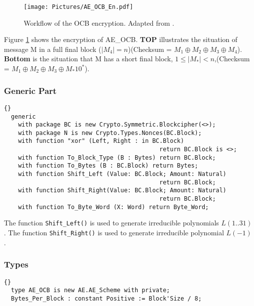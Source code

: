 \begin{figure}[h]
\centering
\texttt{[image: Pictures/AE\_OCB\_En.pdf]} 
\caption{Workflow of the OCB encryption. Adapted from \cite{DBLP:conf/fse/KrovetzR11}.}\label{Workflow_OCB}
\end{figure}
Figure \ref{Workflow_OCB} shows the encryption of AE\_OCB. \textbf{TOP} illustrates the situation of message M in a full final block ($|M_4|=n$)(Checksum = $M_1\oplus M_2\oplus M_3\oplus M_4$). \textbf{Bottom} is the situation that M has a short final block, $1\leq |M_*|< n$,(Checksum = $M_1\oplus M_2\oplus M_3\oplus M_*10^*$).
\subsubsection*{Generic Part}
\begin{lstlisting}{}
  generic
    with package BC is new Crypto.Symmetric.Blockcipher(<>);
    with package N is new Crypto.Types.Nonces(BC.Block);
    with function "xor" (Left, Right : in BC.Block) 
    										return BC.Block is <>;
    with function To_Block_Type (B : Bytes) return BC.Block;
    with function To_Bytes (B : BC.Block) return Bytes;
    with function Shift_Left (Value: BC.Block; Amount: Natural) 
    										return BC.Block;
    with function Shift_Right(Value: BC.Block; Amount: Natural) 
    										return BC.Block;
    with function To_Byte_Word (X: Word) return Byte_Word;  
\end{lstlisting}
The function \texttt{Shift\_Left()} is used to generate irreducible polynomials $L(1..31)$. The function \texttt{Shift\_Right()} is used to generate irreducible polynomial $L(-1)$.\\
\subsubsection*{Types}
\begin{lstlisting}{}
  type AE_OCB is new AE.AE_Scheme with private;
  Bytes_Per_Block : constant Positive := Block'Size / 8;
\end{lstlisting}
